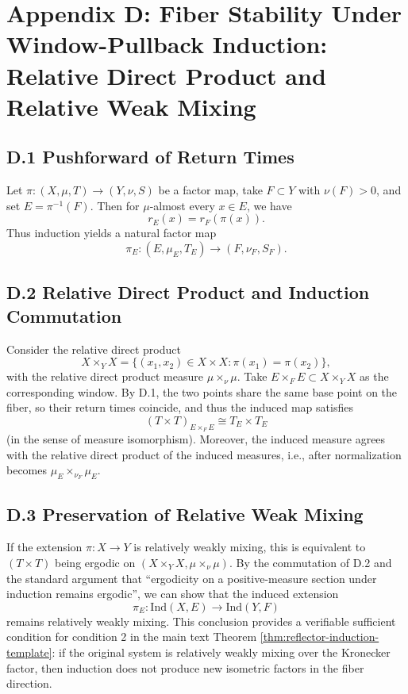 \section{Appendix D: Fiber Stability Under Window-Pullback Induction: Relative Direct Product and Relative Weak Mixing}
\label{app:relative-product}

\subsection*{D.1 Pushforward of Return Times}

Let $\pi:(X,\mu,T)\to(Y,\nu,S)$ be a factor map, take $F\subset Y$ with $\nu(F)>0$, and set $E=\pi^{-1}(F)$. Then for $\mu$-almost every $x\in E$, we have
\[
r_E(x)=r_F(\pi(x)).
\]
Thus induction yields a natural factor map
\[
\pi_E:(E,\mu_E,T_E)\to(F,\nu_F,S_F).
\]

\subsection*{D.2 Relative Direct Product and Induction Commutation}

Consider the relative direct product
\[
X\times_Y X=\{(x_1,x_2)\in X\times X:\pi(x_1)=\pi(x_2)\},
\]
with the relative direct product measure $\mu\times_\nu\mu$. Take $E\times_F E\subset X\times_Y X$ as the corresponding window. By D.1, the two points share the same base point on the fiber, so their return times coincide, and thus the induced map satisfies
\[
(T\times T)_{E\times_F E}\cong T_E\times T_E
\]
(in the sense of measure isomorphism). Moreover, the induced measure agrees with the relative direct product of the induced measures, i.e., after normalization becomes $\mu_E\times_{\nu_F}\mu_E$.

\subsection*{D.3 Preservation of Relative Weak Mixing}

If the extension $\pi:X\to Y$ is relatively weakly mixing, this is equivalent to $(T\times T)$ being ergodic on $(X\times_Y X,\mu\times_\nu\mu)$. By the commutation of D.2 and the standard argument that ``ergodicity on a positive-measure section under induction remains ergodic'', we can show that the induced extension
\[
\pi_E:\mathrm{Ind}(X,E)\to \mathrm{Ind}(Y,F)
\]
remains relatively weakly mixing. This conclusion provides a verifiable sufficient condition for condition 2 in the main text Theorem \ref{thm:reflector-induction-template}: if the original system is relatively weakly mixing over the Kronecker factor, then induction does not produce new isometric factors in the fiber direction.
